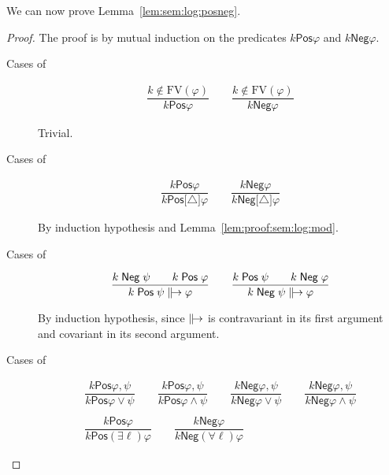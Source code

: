 \documentclass[%
  a4paper,
  UKenglish,
  cleveref,
  autoref,
  thm-restate,
  numberwithinsect,
]{lipics-v2021}
\newcommand\FV{\mathrm{FV}}
\newcommand\term[1]{\mathsf{#1}}
\newcommand\defrealto{\mathrel\parallel\joinrel\to}
\newcommand\realto{\mathrel{\defrealto}}
\newcommand\itvar{k}
\newcommand\itvarbis{\ell}
\newcommand\Pos{\mathrel{\term{Pos}}}
\newcommand\Neg{\mathrel{\term{Neg}}}
\newcommand\form[1]{\lbrack #1 \rbrack}
\newcommand\modgen{\mathord{\triangle}}	%
\begin{document}
We can now prove Lemma~\ref{lem:sem:log:posneg}.

\LemPosNeg*

\begin{proof}
The proof is by mutual induction on the predicates
$\itvar \Pos \varphi$ and $\itvar \Neg \varphi$.
\begin{description}
\item[Cases of]
\[
\begin{array}{c}
%
\dfrac{\itvar \notin \FV(\varphi)}
  {\itvar \Pos \varphi}
%
\qquad
%
\dfrac{\itvar \notin \FV(\varphi)}
  {\itvar \Neg \varphi}
%
\end{array}
\]

Trivial.

\item[Cases of]
\[
\begin{array}{c}
%
\dfrac{\itvar \Pos \varphi}
  {\itvar \Pos \form\modgen \varphi}
%
\qquad
%
\dfrac{\itvar \Neg \varphi}
  {\itvar \Neg \form\modgen \varphi}
%
\end{array}
\]

By induction hypothesis and Lemma~\ref{lem:proof:sem:log:mod}.

\item[Cases of]
\[
\begin{array}{c}
%
\dfrac{\itvar \Neg \psi
  \qquad
  \itvar \Pos \varphi}
  {\itvar \Pos \psi \realto \varphi}
%
\qquad
%
\dfrac{\itvar \Pos \psi
  \qquad
  \itvar \Neg \varphi}
  {\itvar \Neg \psi \realto \varphi}
%
\end{array}
\]

By induction hypothesis, since $\realto$ is contravariant
in its first argument and covariant in its second argument.

\item[Cases of]
\[
\begin{array}{c}
%
\dfrac{\itvar \Pos \varphi, \psi}
  {\itvar \Pos \varphi \lor \psi}
%
\qquad
%
\dfrac{\itvar \Pos \varphi, \psi}
  {\itvar \Pos \varphi \land \psi}
%
\qquad
%
\dfrac{\itvar \Neg \varphi, \psi}
  {\itvar \Neg \varphi \lor \psi}
%
\qquad
%
\dfrac{\itvar \Neg \varphi, \psi}
  {\itvar \Neg \varphi \land \psi}
%
\\\\
%
\dfrac{\itvar \Pos \varphi}
  {\itvar \Pos (\exists \itvarbis)\varphi}
%
\qquad
%
\dfrac{\itvar \Neg \varphi}
  {\itvar \Neg (\forall \itvarbis)\varphi}
%
\end{array}
\]


\end{description}
\end{proof}
\end{document}
